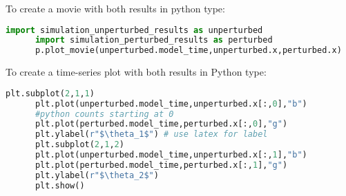       To create a movie with both results in python type:
      \begin{lstlisting}[language=Python,frame=single,caption={Python initialize}]
      import simulation_unperturbed_results as unperturbed
      import simulation_perturbed_results as perturbed
      p.plot_movie(unperturbed.model_time,unperturbed.x,perturbed.x)
      \end{lstlisting}

      To create a time-series plot with both results in Python type:
      \begin{lstlisting}[language=Python,frame=single,caption={Python}]
      plt.subplot(2,1,1)
      plt.plot(unperturbed.model_time,unperturbed.x[:,0],"b") 
      #python counts starting at 0
      plt.plot(perturbed.model_time,perturbed.x[:,0],"g")
      plt.ylabel(r"$\theta_1$") # use latex for label
      plt.subplot(2,1,2)
      plt.plot(unperturbed.model_time,unperturbed.x[:,1],"b")
      plt.plot(perturbed.model_time,perturbed.x[:,1],"g")
      plt.ylabel(r"$\theta_2$")
      plt.show() 
      \end{lstlisting}

